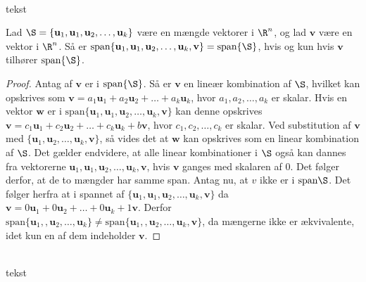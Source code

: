 \\
%
tekst 
%
\begin{thm}{}{}
%
Lad $\S =  \{\mathbf{u}_1,\mathbf{u}_1, \mathbf{u}_2 , \ldots , \mathbf{u}_k \}$ være en mængde vektorer i $\R^n$, og lad $\mathbf{v}$ være en vektor i $\R^n$.
Så er $\text{span}\{ \mathbf{u}_1,\mathbf{u}_1, \mathbf{u}_2 , \ldots , \mathbf{u}_k , \mathbf{v}\} =\text{span}\{\S\}$, hvis og kun hvis $\mathbf{v}$ tilhører $\text{span}\{\S\}$.
%
\end{thm}
%
%
\begin{proof}
%
Antag af $\mathbf{v}$ er i $\text{span}\{\S\}$. Så er $\mathbf{v}$ en lineær kombination af $\S$, hvilket kan opskrives som $\mathbf{v}=a_1\mathbf{u}_1+a_2\mathbf{u}_2+ \ldots + a_k\mathbf{u}_k$, hvor $a_1,a_2,\ldots, a_k$ er skalar. 
Hvis en vektor $\mathbf{w}$ er i $\text{span}\{ \mathbf{u}_1,\mathbf{u}_1, \mathbf{u}_2 , \ldots , \mathbf{u}_k , \mathbf{v}\}$ kan denne opskrives $\mathbf{v}=c_1\mathbf{u}_1+c_2\mathbf{u}_2+ \ldots + c_k\mathbf{u}_k+b\mathbf{v}$, hvor $c_1,c_2,\ldots, c_k$ er skalar.
Ved substitution af $\mathbf{v}$ med $\{ \mathbf{u}_1, \mathbf{u}_2 , \ldots , \mathbf{u}_k , \mathbf{v}\}$, så vides det at $\mathbf{w}$ kan opskrives som en linear kombination af $\S$. 
Det gælder endvidere, at alle linear kombinationer i $\S$ også kan dannes fra vektorerne $\mathbf{u}_1,\mathbf{u}_1, \mathbf{u}_2 , \ldots , \mathbf{u}_k , \mathbf{v}$, hvis $\mathbf{v}$ ganges med skalaren af $0$.
Det følger derfor, at de to mængder har samme span. 
Antag nu, at $v$ ikke er i $\text{span}\S$. 
Det følger herfra at i spannet af 
$\{ \mathbf{u}_1,\mathbf{u}_1, \mathbf{u}_2 , \ldots , \mathbf{u}_k , \mathbf{v}\}$ da 
$\mathbf{v}=0\mathbf{u}_1+0\mathbf{u}_2+ \ldots + 0\mathbf{u}_k+1\mathbf{v}$.
Derfor 
$\text{span}\{ \mathbf{u}_1,, \mathbf{u}_2 , \ldots , \mathbf{u}_k \}
\neq
\text{span}\{ \mathbf{u}_1,, \mathbf{u}_2 , \ldots , \mathbf{u}_k , \mathbf{v}\}$, 
da mængerne ikke er ækvivalente, idet kun en af dem indeholder $\mathbf{v}$. 
%
\end{proof}
\\
%
tekst 
%